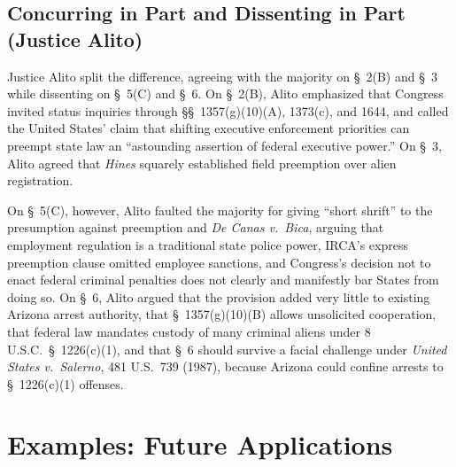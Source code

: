 \documentclass[12pt]{article}
\begin{document}
\subsection{Concurring in Part and Dissenting in Part (Justice Alito)}

Justice Alito split the difference, agreeing with the majority on \S~2(B) and \S~3 while dissenting on \S~5(C) and \S~6. On \S~2(B), Alito emphasized that Congress invited status inquiries through \S\S~1357(g)(10)(A), 1373(c), and 1644, and called the United States' claim that shifting executive enforcement priorities can preempt state law an ``astounding assertion of federal executive power.'' On \S~3, Alito agreed that \textit{Hines} squarely established field preemption over alien registration.

On \S~5(C), however, Alito faulted the majority for giving ``short shrift'' to the presumption against preemption and \textit{De Canas v.\ Bica}, arguing that employment regulation is a traditional state police power, IRCA's express preemption clause omitted employee sanctions, and Congress's decision not to enact federal criminal penalties does not clearly and manifestly bar States from doing so. On \S~6, Alito argued that the provision added very little to existing Arizona arrest authority, that \S~1357(g)(10)(B) allows unsolicited cooperation, that federal law mandates custody of many criminal aliens under 8 U.S.C.\ \S~1226(c)(1), and that \S~6 should survive a facial challenge under \textit{United States v.\ Salerno}, 481 U.S.\ 739 (1987), because Arizona could confine arrests to \S~1226(c)(1) offenses.

\section{Examples: Future Applications}
\end{document}
